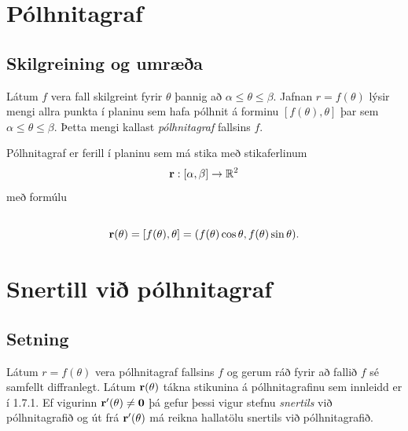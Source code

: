 \documentclass[a4paper,10pt,icelandic]{sphinxmanual}
\begin{document}
\section{Pólhnitagraf}
\label{Kafli1:polhnitagraf}

\subsection{Skilgreining og umræða}
\label{Kafli1:id10}\label{Kafli1:index-10}
Látum \(f\) vera fall skilgreint fyrir \(\theta\) þannig að
\(\alpha\leq\theta\leq\beta\). Jafnan \(r=f(\theta)\) lýsir
mengi allra punkta í planinu sem hafa pólhnit á forminu
\([f(\theta),\theta]\) þar sem \(\alpha\leq\theta\leq\beta\).
Þetta mengi kallast \emph{pólhnitagraf} fallsins \(f\).

Pólhnitagraf er ferill í planinu sem má stika með stikaferlinum
\begin{gather}
\begin{split}\displaystyle \mbox{${\bf r}$}:[\alpha,\beta]\rightarrow{\mathbb  R}^2\end{split}\notag
\end{gather}
með formúlu
\begin{gather}
\begin{split}\displaystyle\end{split}\notag\\\begin{split}\mbox{${\bf r}$}(\theta)=[f(\theta),\theta]=
(f(\theta)\cos\theta, f(\theta)\sin\theta).\end{split}\notag
\end{gather}

\section{Snertill við pólhnitagraf}
\label{Kafli1:snertill-vi-polhnitagraf}\label{Kafli1:index-11}

\subsection{Setning}
\label{Kafli1:id11}
Látum \(r=f(\theta)\) vera pólhnitagraf fallsins \(f\) og gerum
ráð fyrir að fallið \(f\) sé samfellt diffranlegt. Látum
\(\mbox{${\bf r}$}(\theta)\) tákna stikunina á pólhnitagrafinu sem
innleidd er í 1.7.1. Ef vigurinn
\(\mbox{${\bf r}$}'(\theta)\neq \mbox{${\bf 0}$}\) þá gefur þessi
vigur stefnu \textit{snertils} við pólhnitagrafið og út frá
\(\mbox{${\bf r}$}'(\theta)\) má reikna hallatölu snertils við
pólhnitagrafið.
\end{document}
